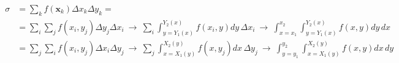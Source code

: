 \documentclass[letterpaper,10pt,italian]{jupyterBook}
\begin{document}
\sphinxAtStartPar
{}   
\begin{equation*}
\begin{split}\begin{aligned}
  \sigma 
 & = \sum_k f(\mathbf{x}_k) \Delta x_k \Delta y_k = \\
 & = \sum_i \sum_j f(x_i, y_j) \Delta y_j \Delta x_i 
  \ \rightarrow \ \sum_i \int_{y=Y_1(x)}^{Y_2(x)} f(x_i, y) dy \, \Delta x_i 
  \ \rightarrow \ \int_{x=x_1}^{x_2} \int_{y=Y_1(x)}^{Y_2(x)} f(x, y) dy \, dx  \\
 & = \sum_j \sum_i f(x_i, y_j) \Delta x_i \Delta y_j 
  \ \rightarrow \ \sum_j \int_{x=X_1(y)}^{X_2(y)} f(x, y_j) dx \, \Delta y_j 
  \ \rightarrow \ \int_{y=y_1}^{y_2} \int_{x=X_1(y)}^{X_2(y)} f(x, y) dx \, dy \\
\end{aligned}\end{split}
\end{equation*}\label{ch/multivariable-calculus/integrals:multivariable-calculus:integral:example}
\end{document}

